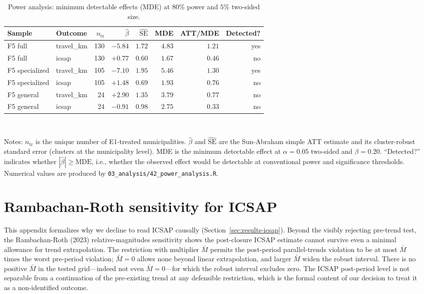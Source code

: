 \begin{table}[h!]
\centering
\caption{Power analysis: minimum detectable effects (MDE) at $80\%$
power and $5\%$ two-sided size.}
\label{tab:power}
\begin{tabular}{llrrrrrr}
\toprule
Sample & Outcome & $n_{\text{tr}}$ & $\widehat{\beta}$ &
$\widehat{\mathrm{SE}}$ & MDE & ATT/MDE & Detected? \\
\midrule
F5 full       & travel\_km     & 130 & $-5.84$ & $1.72$ & $4.83$ & $1.21$ & yes \\
F5 full       & icsap          & 130 & $+0.77$ & $0.60$ & $1.67$ & $0.46$ & no  \\
F5 specialized & travel\_km    & 105 & $-7.10$ & $1.95$ & $5.46$ & $1.30$ & yes \\
F5 specialized & icsap         & 105 & $+1.48$ & $0.69$ & $1.93$ & $0.76$ & no  \\
F5 general     & travel\_km    &  24 & $+2.90$ & $1.35$ & $3.79$ & $0.77$ & no  \\
F5 general     & icsap         &  24 & $-0.91$ & $0.98$ & $2.75$ & $0.33$ & no  \\
\bottomrule
\end{tabular}
\\[0.5em]
\begin{minipage}{0.95\textwidth}
\footnotesize Notes: $n_{\text{tr}}$ is the unique number of E1-treated
municipalities. $\widehat{\beta}$ and $\widehat{\mathrm{SE}}$ are the
Sun-Abraham simple ATT estimate and its cluster-robust standard error
(clusters at the municipality level). MDE is the minimum detectable
effect at $\alpha = 0.05$ two-sided and $\beta = 0.20$. ``Detected?''
indicates whether $|\widehat{\beta}| \ge \mathrm{MDE}$, i.e., whether
the observed effect would be detectable at conventional power and
significance thresholds. Numerical values are produced by
\texttt{03\_analysis/42\_power\_analysis.R}.
\end{minipage}
\end{table}

\section{Rambachan-Roth sensitivity for ICSAP}
\label{app:rr}

This appendix formalizes why we decline to read ICSAP causally
(Section~\ref{sec:results-icsap}). Beyond the visibly rejecting pre-trend
test, the Rambachan-Roth (2023) relative-magnitudes sensitivity shows the
post-closure ICSAP estimate cannot survive even a minimal allowance for
trend extrapolation. The restriction with multiplier $\bar M$ permits the
post-period parallel-trends violation to be at most $\bar M$ times the
worst pre-period violation; $\bar M = 0$ allows none beyond linear
extrapolation, and larger $\bar M$ widen the robust interval. There is no
positive $\bar M$ in the tested grid---indeed not even $\bar M = 0$---for
which the robust interval excludes zero. The ICSAP post-period level is
not separable from a continuation of the pre-existing trend at any
defensible restriction, which is the formal content of our decision to
treat it as a non-identified outcome.


